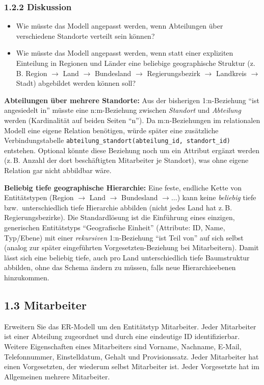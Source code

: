\documentclass[11pt,a4paper]{article}
\begin{document}
\subsubsection*{1.2.2 Diskussion}
\begin{itemize}
\item Wie m\"usste das Modell angepasst werden, wenn Abteilungen \"uber verschiedene Standorte verteilt sein k\"onnen?
\item Wie m\"usste das Modell angepasst werden, wenn statt einer expliziten Einteilung in Regionen und L\"ander eine beliebige geographische Struktur (z.\,B. Region $\to$ Land $\to$ Bundesland $\to$ Regierungsbezirk $\to$ Landkreis $\to$ Stadt) abgebildet werden k\"onnen soll?
\end{itemize}

\begin{loesung}
\textbf{Abteilungen \"uber mehrere Standorte:} Aus der bisherigen 1:n-Beziehung ``ist angesiedelt in'' m\"usste eine n:m-Beziehung zwischen \emph{Standort} und \emph{Abteilung} werden (Kardinalit\"at auf beiden Seiten ``n''). Da m:n-Beziehungen im relationalen Modell eine eigene Relation ben\"otigen, w\"urde sp\"ater eine zus\"atzliche Verbindungstabelle \texttt{abteilung\_standort(abteilung\_id, standort\_id)} entstehen. Optional k\"onnte diese Beziehung noch um ein Attribut erg\"anzt werden (z.\,B. Anzahl der dort besch\"aftigten Mitarbeiter je Standort), was ohne eigene Relation gar nicht abbildbar w\"are.

\textbf{Beliebig tiefe geographische Hierarchie:} Eine feste, endliche Kette von Entit\"atstypen (Region $\to$ Land $\to$ Bundesland $\to \dots$) kann keine \emph{beliebig} tiefe bzw.\ unterschiedlich tiefe Hierarchie abbilden (nicht jedes Land hat z.\,B. Regierungsbezirke). Die Standardl\"osung ist die Einf\"uhrung eines einzigen, generischen Entit\"atstyps ``Geografische Einheit'' (Attribute: ID, Name, Typ/Ebene) mit einer \emph{rekursiven} 1:n-Beziehung ``ist Teil von'' auf sich selbst (analog zur sp\"ater eingef\"uhrten Vorgesetzten-Beziehung bei Mitarbeitern). Damit l\"asst sich eine beliebig tiefe, auch pro Land unterschiedlich tiefe Baumstruktur abbilden, ohne das Schema \"andern zu m\"ussen, falls neue Hierarchieebenen hinzukommen.
\end{loesung}

\subsection*{1.3 \quad Mitarbeiter}
Erweitern Sie das ER-Modell um den Entit\"atstyp Mitarbeiter. Jeder Mitarbeiter ist einer Abteilung zugeordnet und durch eine eindeutige ID identifizierbar. Weitere Eigenschaften eines Mitarbeiters sind Vorname, Nachname, E-Mail, Telefonnummer, Einstelldatum, Gehalt und Provisionssatz. Jeder Mitarbeiter hat einen Vorgesetzten, der wiederum selbst Mitarbeiter ist. Jeder Vorgesetzte hat im Allgemeinen mehrere Mitarbeiter.
\end{document}
